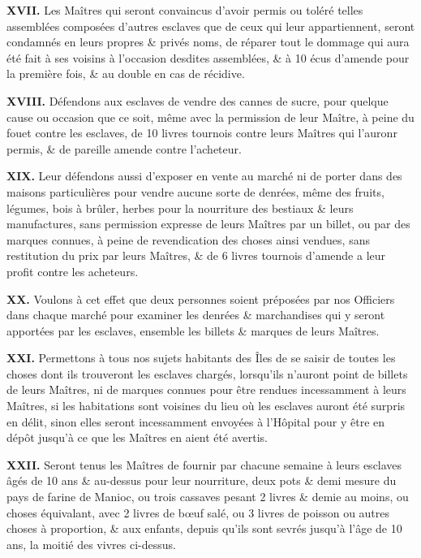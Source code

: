 \documentclass[french,twoside]{book} %
\newcommand{\labelchar}[1]{{\color{rubric}\bf #1}}
\begin{document}
\labelchar{XVII.} Les Maîtres qui seront convaincus d’avoir permis ou toléré telles assemblées composées d’autres esclaves que de ceux qui leur appartiennent, seront condamnés en leurs propres \& privés noms, de réparer tout le dommage qui aura été fait à ses voisins à l’occasion desdites assemblées, \& à 10 écus d’amende pour la première fois, \& au double en cas de récidive.\par
\labelchar{XVIII.} Défendons aux esclaves de vendre des cannes de sucre, pour quelque cause ou occasion que ce soit, même avec la permission de leur Maître, à peine du fouet contre les esclaves, de 10 livres tournois contre leurs Maîtres qui l’auronr permis, \& de pareille amende contre l’acheteur.\par
\labelchar{XIX.} Leur défendons aussi d’exposer en vente au marché ni de porter dans des maisons particulières pour vendre aucune sorte de denrées, même des fruits, légumes, bois à brûler, herbes pour la nourriture des bestiaux \& leurs manufactures, sans permission expresse de leurs Maîtres par un billet, ou par des marques connues, à peine de revendication des choses ainsi vendues, sans restitution du prix par leurs Maîtres, \& de 6 livres tournois d’amende a leur profit contre les acheteurs.\par
\labelchar{XX.} Voulons à cet effet que deux personnes soient préposées par nos Officiers dans chaque marché pour examiner les denrées \& marchandises qui y seront apportées par les esclaves, ensemble les billets \& marques de leurs Maîtres.\par
\labelchar{XXI.} Permettons à tous nos sujets habitants des Îles de se saisir de toutes les choses dont ils trouveront les esclaves chargés, lorsqu’ils n’auront point de billets de leurs Maîtres, ni de marques connues pour être rendues incessamment à leurs Maîtres, si les habitations sont voisines du lieu où les esclaves auront été surpris en délit, sinon elles seront incessamment envoyées à l’Hôpital pour y être en dépôt jusqu’à ce que les Maîtres en aient été avertis.\par
\labelchar{XXII.} Seront tenus les Maîtres de fournir par chacune semaine à leurs esclaves âgés de 10 ans \& au-dessus pour leur nourriture, deux pots \& demi mesure du pays de farine de Manioc, ou trois cassaves pesant 2 livres \& demie au moins, ou choses équivalant, avec 2 livres de bœuf salé, ou 3 livres de poisson ou autres choses à proportion, \& aux enfants, depuis qu’ils sont sevrés jusqu’à l’âge de 10 ans, la moitié des vivres ci-dessus.\par
\end{document}
